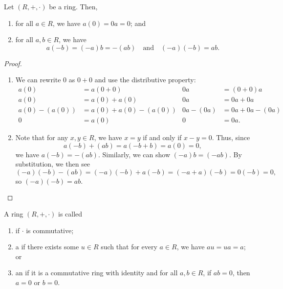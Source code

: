 \begin{prop}
Let $ (R,+,\cdot) $ be a ring. Then,
\begin{enumerate}
    \item for all $ a\in R $, we have $ a(0)=0a=0 $; and
    \item for all $ a,b\in R $, we have
    \begin{equation*}
        a(-b)=(-a)b=-(ab) \quad\text{and}\quad (-a)(-b)=ab.
    \end{equation*}
\end{enumerate}
\end{prop}
\begin{proof}~
\begin{enumerate}
    \item We can rewrite $ 0 $ as $ 0+0 $ and use the distributive property:
    \begin{align*}
        a(0) &= a(0+0) & 0a &= (0+0)a \\
        a(0) &= a(0)+a(0) & 0a &= 0a+0a \\
        a(0)-(a(0)) &= a(0)+a(0)-(a(0)) & 0a-(0a) &= 0a+0a-(0a) \\
        0 &= a(0) & 0 &= 0a.
    \end{align*}

    \item Note that for any $ x,y\in R $, we have $ x=y $ if and only if $ x-y=0 $. Thus, since
    \begin{equation*}
        a(-b)+(ab)=a(-b+b)=a(0)=0,
    \end{equation*}
    we have $ a(-b)=-(ab) $. Similarly, we can show $ (-a)b=(-ab) $. By substitution, we then see
    \begin{equation*}
        (-a)(-b)-(ab)=(-a)(-b)+a(-b)=(-a+a)(-b)=0(-b)=0,
    \end{equation*}
    so $ (-a)(-b)=ab $.\qedhere
\end{enumerate}
\end{proof}

\begin{defn}\label{defn:ring_types}
A ring $ (R,+,\cdot) $ is called
\begin{enumerate}
    \item {} if $ \cdot $ is commutative;
    \item a  if there exists some $ u\in R $ such that for every $ a\in R $, we have $ au=ua=a $; or
    \item an  if it is a commutative ring with identity and for all $ a,b\in R $, if $ ab=0 $, then $ a=0 $ or $ b=0 $.
\end{enumerate}
\end{defn}

